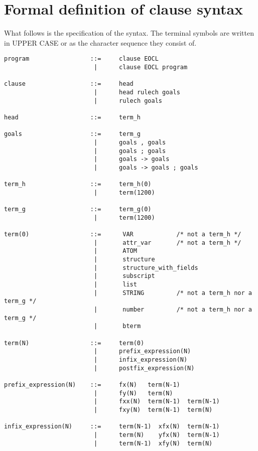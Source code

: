 \section{Formal definition of clause syntax}
What follows is the specification of the syntax. The terminal symbols are 
written in UPPER CASE or as the character sequence they consist of.
\begin{verbatim}
program                 ::=     clause EOCL
                         |      clause EOCL program

clause                  ::=     head
                         |      head rulech goals
                         |      rulech goals

head                    ::=     term_h

goals                   ::=     term_g
                         |      goals , goals
                         |      goals ; goals
                         |      goals -> goals
                         |      goals -> goals ; goals

term_h                  ::=     term_h(0)
                         |      term(1200)

term_g                  ::=     term_g(0)
                         |      term(1200)

term(0)                 ::=      VAR            /* not a term_h */
                         |       attr_var       /* not a term_h */
                         |       ATOM
                         |       structure
                         |       structure_with_fields
                         |       subscript
                         |       list
                         |       STRING         /* not a term_h nor a term_g */
                         |       number         /* not a term_h nor a term_g */
                         |       bterm

term(N)                 ::=     term(0)
                         |      prefix_expression(N)
                         |      infix_expression(N)
                         |      postfix_expression(N)

prefix_expression(N)    ::=     fx(N)   term(N-1)
                         |      fy(N)   term(N)
                         |      fxx(N)  term(N-1)  term(N-1)
                         |      fxy(N)  term(N-1)  term(N)

infix_expression(N)     ::=     term(N-1)  xfx(N)  term(N-1)
                         |      term(N)    yfx(N)  term(N-1)
                         |      term(N-1)  xfy(N)  term(N)


\end{verbatim}
